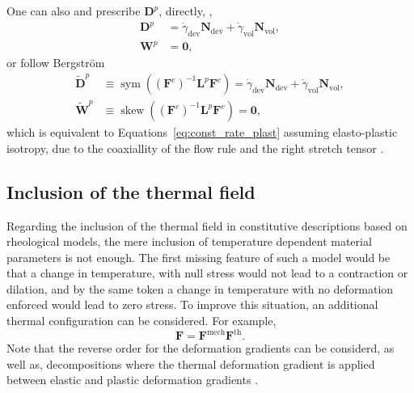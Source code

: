 One can also and prescribe $\mathbf D^p$, directly, \citep{boyceLargeInelasticDeformation1988},
\begin{align}
\label{eq:d_w_directly}
	\mathbf D^p & = \dot\gamma_\text{dev} \mathbf N_\text{dev} + \dot\gamma_\text{vol} \mathbf N_\text{vol},\\
	\mathbf W^p & = \bm 0,
\end{align}
or follow Bergström \citep{bergstromMechanicsSolidPolymers2015}
\begin{align}
	\label{eq:d_w_bergstrom}
	\tilde{\mathbf D}^p &\equiv \operatorname{sym}((\mathbf F^e)^{-1}\mathbf L^p \mathbf F^e) = \dot\gamma_\text{dev} \mathbf N_\text{dev} + \dot\gamma_\text{vol} \mathbf N_\text{vol},\\
	\tilde{\mathbf W}^p &\equiv \operatorname{skew}( (\mathbf F^e)^{-1}\mathbf L^p \mathbf F^e) = \bm 0,
\end{align}
which is equivalent to Equations~\eqref{eq:const_rate_plast} assuming elasto-plastic isotropy, due to the coaxiallity of the flow rule and the right stretch tensor \citep{desouzanetoComputationalMethodsPlasticity2008}.

\subsection{Inclusion of the thermal field}
\label{sec:inclusion_thermal_field}

Regarding the inclusion of the thermal field in constitutive descriptions based on rheological models, the mere inclusion of temperature dependent material parameters is not enough.
The first missing feature of such a model would be that a change in temperature, with null stress would not lead to a contraction or dilation, and by the same token a change in temperature with no deformation enforced would lead to zero stress.
To improve this situation, an additional thermal configuration can be considered.
For example,
\begin{equation}
	\mathbf F = \mathbf F^\text{mech}\mathbf F^\text{th}.
\end{equation}
Note that the reverse order for the deformation gradients can be considerd, as well as, decompositions where the thermal deformation gradient is applied between elastic and plastic deformation gradients \citep{arrudaEffectsStrainRate1995}.

